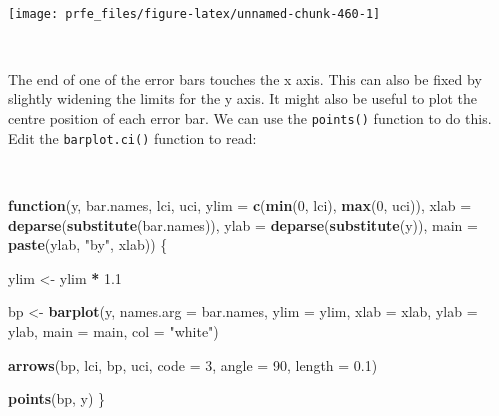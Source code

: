\documentclass[12pt,a4paper]{book}
\newenvironment{Shaded}{\begin{snugshade}}{\end{snugshade}}
\newcommand{\KeywordTok}[1]{\textcolor[rgb]{0.13,0.29,0.53}{\textbf{#1}}}
\newcommand{\DataTypeTok}[1]{\textcolor[rgb]{0.13,0.29,0.53}{#1}}
\newcommand{\DecValTok}[1]{\textcolor[rgb]{0.00,0.00,0.81}{#1}}
\newcommand{\FloatTok}[1]{\textcolor[rgb]{0.00,0.00,0.81}{#1}}
\newcommand{\StringTok}[1]{\textcolor[rgb]{0.31,0.60,0.02}{#1}}
\newcommand{\ControlFlowTok}[1]{\textcolor[rgb]{0.13,0.29,0.53}{\textbf{#1}}}
\newcommand{\OperatorTok}[1]{\textcolor[rgb]{0.81,0.36,0.00}{\textbf{#1}}}
\newcommand{\NormalTok}[1]{#1}
\theoremstyle{definition}
\theoremstyle{definition}
\theoremstyle{definition}
\theoremstyle{remark}
\begin{document}
~

\begin{Shaded}
\end{Shaded}

\begin{center}\texttt{[image: prfe\_files/figure-latex/unnamed-chunk-460-1]} \end{center}

~

The end of one of the error bars touches the x axis. This can also be
fixed by slightly widening the limits for the y axis. It might also be
useful to plot the centre position of each error bar. We can use the
\texttt{points()} function to do this. Edit the \texttt{barplot.ci()}
function to read:

~

\begin{Shaded}
\begin{Highlighting}[]
\ControlFlowTok{function}\NormalTok{(y, bar.names, lci, uci,}
         \DataTypeTok{ylim =} \KeywordTok{c}\NormalTok{(}\KeywordTok{min}\NormalTok{(}\DecValTok{0}\NormalTok{, lci), }\KeywordTok{max}\NormalTok{(}\DecValTok{0}\NormalTok{, uci)),}
         \DataTypeTok{xlab =} \KeywordTok{deparse}\NormalTok{(}\KeywordTok{substitute}\NormalTok{(bar.names)),}
         \DataTypeTok{ylab =} \KeywordTok{deparse}\NormalTok{(}\KeywordTok{substitute}\NormalTok{(y)),}
         \DataTypeTok{main =} \KeywordTok{paste}\NormalTok{(ylab, }\StringTok{"by"}\NormalTok{, xlab)) \{}
     
\NormalTok{  ylim <-}\StringTok{ }\NormalTok{ylim }\OperatorTok{*}\StringTok{ }\FloatTok{1.1}
     
\NormalTok{  bp <-}\StringTok{ }\KeywordTok{barplot}\NormalTok{(y, }\DataTypeTok{names.arg =}\NormalTok{ bar.names, }\DataTypeTok{ylim =}\NormalTok{ ylim, }\DataTypeTok{xlab =}\NormalTok{ xlab,}
                \DataTypeTok{ylab =}\NormalTok{ ylab, }\DataTypeTok{main =}\NormalTok{ main, }\DataTypeTok{col =} \StringTok{"white"}\NormalTok{)}
     
  \KeywordTok{arrows}\NormalTok{(bp, lci, bp, uci, }\DataTypeTok{code =} \DecValTok{3}\NormalTok{, }\DataTypeTok{angle =} \DecValTok{90}\NormalTok{, }\DataTypeTok{length =} \FloatTok{0.1}\NormalTok{)}
     
  \KeywordTok{points}\NormalTok{(bp, y)}
\NormalTok{\}}
\end{Highlighting}
\end{Shaded}
\end{document}

